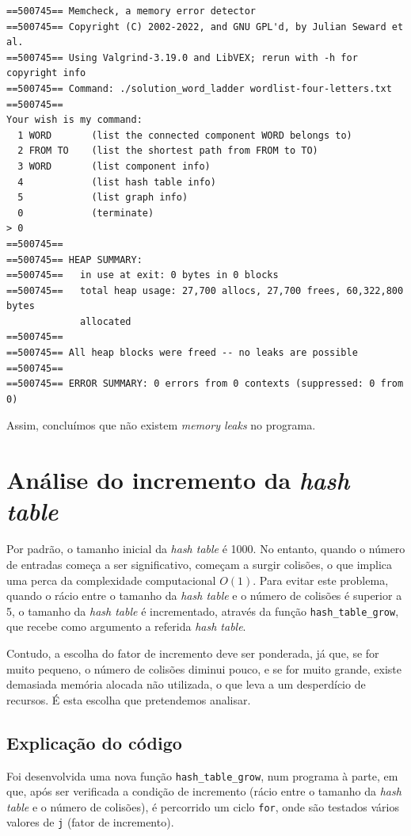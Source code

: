 \documentclass[portuguese,11pt,a4paper,titlepage]{article}
\begin{document}
\begin{verbatim}
==500745== Memcheck, a memory error detector
==500745== Copyright (C) 2002-2022, and GNU GPL'd, by Julian Seward et al.
==500745== Using Valgrind-3.19.0 and LibVEX; rerun with -h for copyright info
==500745== Command: ./solution_word_ladder wordlist-four-letters.txt
==500745== 
Your wish is my command:
  1 WORD       (list the connected component WORD belongs to)
  2 FROM TO    (list the shortest path from FROM to TO)
  3 WORD       (list component info)
  4            (list hash table info)
  5            (list graph info)
  0            (terminate)
> 0
==500745== 
==500745== HEAP SUMMARY:
==500745==   in use at exit: 0 bytes in 0 blocks
==500745==   total heap usage: 27,700 allocs, 27,700 frees, 60,322,800 bytes
             allocated
==500745== 
==500745== All heap blocks were freed -- no leaks are possible
==500745== 
==500745== ERROR SUMMARY: 0 errors from 0 contexts (suppressed: 0 from 0)
\end{verbatim}

Assim, concluímos que não existem \textit{memory leaks} no programa. 

\pagebreak
\section{Análise do incremento da \textit{hash table}}
Por padrão, o tamanho inicial da \textit{hash table} é 1000. No entanto, quando o número de entradas começa a ser significativo, começam a surgir colisões, o que implica uma perca da complexidade computacional \begin{math}O(1)\end{math}. Para evitar este problema, quando o rácio entre o tamanho da \textit{hash table} e o número de colisões é superior a 5, o tamanho da \textit{hash table} é incrementado, através da função \lstinline|hash_table_grow|, que recebe como argumento a referida \textit{hash table}.

Contudo, a escolha do fator de incremento deve ser ponderada, já que, se for muito pequeno, o número de colisões diminui pouco, e se for muito grande, existe demasiada memória alocada não utilizada, o que leva a um desperdício de recursos. É esta escolha que pretendemos analisar.

\subsection{Explicação do código}
Foi desenvolvida uma nova função \lstinline|hash_table_grow|, num programa à parte, em que, após ser verificada a condição de incremento (rácio entre o tamanho da \textit{hash table} e o número de colisões), é percorrido um ciclo \lstinline|for|, onde são testados vários valores de \lstinline|j| (fator de incremento).
\end{document}

